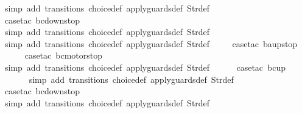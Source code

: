 \begin{isabellebody}
\ {\isacharparenleft}simp\ add{\isacharcolon}\ transitions\ choice{\isacharunderscore}def\ apply{\isacharunderscore}guards{\isacharunderscore}def\ Str{\isacharunderscore}def{\isacharparenright}\isanewline
\ \ \ \ \isamarkupfalse%
\ {\isacharparenleft}case{\isacharunderscore}tac\ {\isachardoublequoteopen}bc{\isacharequal}down{}{}stop{\isachardoublequoteclose}{\isacharparenright}\isanewline
\ \ \ \ \ \isamarkupfalse%
\ {\isacharparenleft}simp\ add{\isacharcolon}\ transitions\ choice{\isacharunderscore}def\ apply{\isacharunderscore}guards{\isacharunderscore}def\ Str{\isacharunderscore}def{\isacharparenright}\isanewline
\ \ \ \ \isamarkupfalse%
\ {\isacharparenleft}simp\ add{\isacharcolon}\ transitions\ choice{\isacharunderscore}def\ apply{\isacharunderscore}guards{\isacharunderscore}def\ Str{\isacharunderscore}def{\isacharparenright}\isanewline
\ \ \ \isamarkupfalse%
\ {\isacharparenleft}case{\isacharunderscore}tac\ {\isachardoublequoteopen}ba{\isacharequal}up{}{}stop{\isachardoublequoteclose}{\isacharparenright}\isanewline
\ \ \ \ \isamarkupfalse%
\ {\isacharparenleft}case{\isacharunderscore}tac\ {\isachardoublequoteopen}bc{\isacharequal}motorstop{}{\isachardoublequoteclose}{\isacharparenright}\isanewline
\ \ \ \ \ \isamarkupfalse%
\ {\isacharparenleft}simp\ add{\isacharcolon}\ transitions\ choice{\isacharunderscore}def\ apply{\isacharunderscore}guards{\isacharunderscore}def\ Str{\isacharunderscore}def{\isacharparenright}\isanewline
\ \ \ \ \isamarkupfalse%
\ {\isacharparenleft}case{\isacharunderscore}tac\ {\isachardoublequoteopen}bc{\isacharequal}up{}{}{\isachardoublequoteclose}{\isacharparenright}\isanewline
\ \ \ \ \ \isamarkupfalse%
\ {\isacharparenleft}simp\ add{\isacharcolon}\ transitions\ choice{\isacharunderscore}def\ apply{\isacharunderscore}guards{\isacharunderscore}def\ Str{\isacharunderscore}def{\isacharparenright}\isanewline
\ \ \ \ \isamarkupfalse%
\ {\isacharparenleft}case{\isacharunderscore}tac\ {\isachardoublequoteopen}bc{\isacharequal}down{}{}stop{\isachardoublequoteclose}{\isacharparenright}\isanewline
\ \ \ \ \ \isamarkupfalse%
\ {\isacharparenleft}simp\ add{\isacharcolon}\ transitions\ choice{\isacharunderscore}def\ apply{\isacharunderscore}guards{\isacharunderscore}def\ Str{\isacharunderscore}def{\isacharparenright}\isanewline
\ \ \ \ \isamarkupfalse%

\end{isabellebody}
